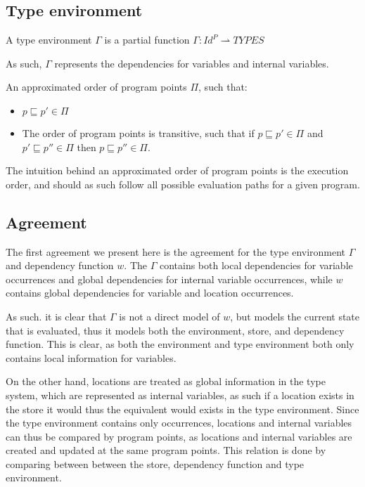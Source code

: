 \documentclass[../../master.tex]{subfiles}
\begin{document}
\subsection{Type environment}
\begin{definition}
	A type environment $\Gamma$ is a partial function $\Gamma:Id^P\rightharpoonup TYPES$
\end{definition}
As such, $\Gamma$ represents the dependencies for variables and internal variables.

\begin{definition}
	An approximated order of program points $\Pi$, such that: 
	\begin{itemize}
		\item  $p\sqsubseteq p'\in\Pi$
		\item The order of program points is transitive, such that if $p\sqsubseteq p'\in\Pi$ and $p'\sqsubseteq p''\in\Pi$ then $p\sqsubseteq p''\in\Pi$.
	\end{itemize}
\end{definition}
The intuition behind an approximated order of program points is the execution order, and should as such follow all possible evaluation paths for a given program.

\subsection{Agreement}
The first agreement we present here is the agreement for the type environment $\Gamma$ and dependency function $w$.
The $\Gamma$ contains both local dependencies for variable occurrences and global dependencies for internal variable occurrences, while $w$ contains global dependencies for variable and location occurrences.

As such. it is clear that $\Gamma$ is not a direct model of $w$, but models the current state that is evaluated, thus it models both the environment, store, and dependency function.
This is clear, as both the environment and type environment both only contains local information for variables.

On the other hand, locations are treated as global information in the type system, which are represented as internal variables, as such if a location exists in the store it would thus the equivalent would exists in the type environment.
Since the type environment contains only occurrences, locations and internal variables can thus be compared by program points, as locations and internal variables are created and updated at the same program points.
This relation is done by comparing between between the store, dependency function and type environment.
\end{document}
